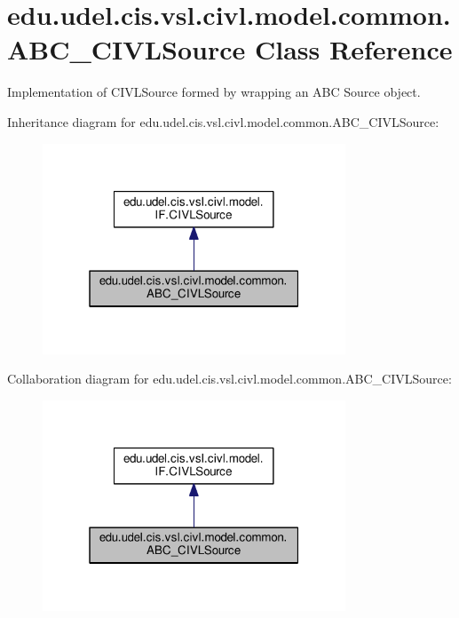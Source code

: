 \hypertarget{classedu_1_1udel_1_1cis_1_1vsl_1_1civl_1_1model_1_1common_1_1ABC__CIVLSource}{}\section{edu.\+udel.\+cis.\+vsl.\+civl.\+model.\+common.\+A\+B\+C\+\_\+\+C\+I\+V\+L\+Source Class Reference}
\label{classedu_1_1udel_1_1cis_1_1vsl_1_1civl_1_1model_1_1common_1_1ABC__CIVLSource}


Implementation of C\+I\+V\+L\+Source formed by wrapping an A\+B\+C Source object.  




Inheritance diagram for edu.\+udel.\+cis.\+vsl.\+civl.\+model.\+common.\+A\+B\+C\+\_\+\+C\+I\+V\+L\+Source\+:
\nopagebreak
\begin{figure}[H]
\begin{center}
\leavevmode
\includegraphics[width=256pt]{classedu_1_1udel_1_1cis_1_1vsl_1_1civl_1_1model_1_1common_1_1ABC__CIVLSource__inherit__graph}
\end{center}
\end{figure}


Collaboration diagram for edu.\+udel.\+cis.\+vsl.\+civl.\+model.\+common.\+A\+B\+C\+\_\+\+C\+I\+V\+L\+Source\+:
\nopagebreak
\begin{figure}[H]
\begin{center}
\leavevmode
\includegraphics[width=256pt]{classedu_1_1udel_1_1cis_1_1vsl_1_1civl_1_1model_1_1common_1_1ABC__CIVLSource__coll__graph}
\end{center}
\end{figure}
